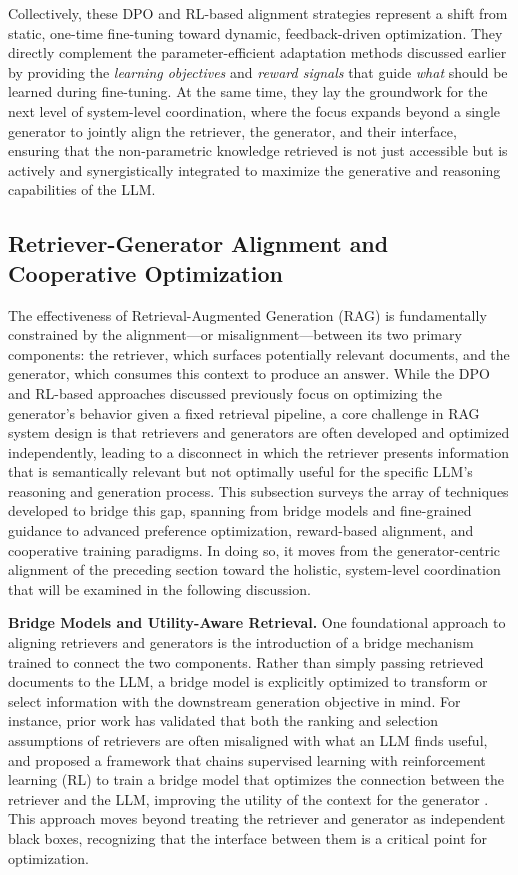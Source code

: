 \documentclass[11pt]{article}
\begin{document}
Collectively, these DPO and RL-based alignment strategies represent a shift from static, one-time fine-tuning toward dynamic, feedback-driven optimization. They directly complement the parameter-efficient adaptation methods discussed earlier by providing the \emph{learning objectives} and \emph{reward signals} that guide \emph{what} should be learned during fine-tuning. At the same time, they lay the groundwork for the next level of system-level coordination, where the focus expands beyond a single generator to jointly align the retriever, the generator, and their interface, ensuring that the non-parametric knowledge retrieved is not just accessible but is actively and synergistically integrated to maximize the generative and reasoning capabilities of the LLM.

\subsection{Retriever-Generator Alignment and Cooperative Optimization}

The effectiveness of Retrieval-Augmented Generation (RAG) is fundamentally constrained by the alignment---or misalignment---between its two primary components: the retriever, which surfaces potentially relevant documents, and the generator, which consumes this context to produce an answer. While the DPO and RL-based approaches discussed previously focus on optimizing the generator's behavior given a fixed retrieval pipeline, a core challenge in RAG system design is that retrievers and generators are often developed and optimized independently, leading to a disconnect in which the retriever presents information that is semantically relevant but not optimally useful for the specific LLM's reasoning and generation process. This subsection surveys the array of techniques developed to bridge this gap, spanning from bridge models and fine-grained guidance to advanced preference optimization, reward-based alignment, and cooperative training paradigms. In doing so, it moves from the generator-centric alignment of the preceding section toward the holistic, system-level coordination that will be examined in the following discussion.

\textbf{Bridge Models and Utility-Aware Retrieval.} One foundational approach to aligning retrievers and generators is the introduction of a bridge mechanism trained to connect the two components. Rather than simply passing retrieved documents to the LLM, a bridge model is explicitly optimized to transform or select information with the downstream generation objective in mind. For instance, prior work has validated that both the ranking and selection assumptions of retrievers are often misaligned with what an LLM finds useful, and proposed a framework that chains supervised learning with reinforcement learning (RL) to train a bridge model that optimizes the connection between the retriever and the LLM, improving the utility of the context for the generator \cite{ref275}. This approach moves beyond treating the retriever and generator as independent black boxes, recognizing that the interface between them is a critical point for optimization.
\end{document}
